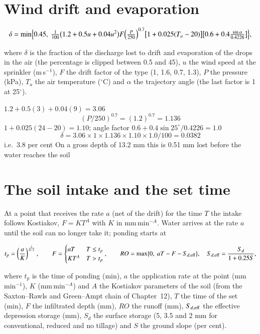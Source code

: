 \section{Wind drift and evaporation}
\begin{equation}\delta=\min\Bigl\{0.45,\ \tfrac1{100}\bigl(1.2+0.5u+0.04u^{2}\bigr)F\Bigl(\tfrac{P}{250}\Bigr)^{0.7}\bigl[1+0.025(T_a-20)\bigr]\bigl[0.6+0.4\tfrac{\sin\alpha}{0.4226}\bigr]\Bigr\},\label{eq:p-wd}\end{equation}
\par\noindent where $\delta$ is the fraction of the discharge lost to drift and evaporation of the drops in the air (the percentage is clipped between 0.5 and 45), $u$ the wind speed at the sprinkler (m\,s$^{-1}$), $F$ the drift factor of the type (1, 1.6, 0.7, 1.3), $P$ the pressure (kPa), $T_a$ the air temperature ($^\circ$C) and $\alpha$ the trajectory angle (the last factor is 1 at 25$^\circ$).

\sol $1.2+0.5(3)+0.04(9)=3.06$ \ans \[(P/250)^{0.7}=(1.2)^{0.7}=1.136\]
$1+0.025(24-20)=1.10$; angle factor $0.6+0.4\sin25^\circ/0.4226=1.0$ \ans \[\delta=3.06\times1\times1.136\times1.10\times1.0/100=0.0382\]
i.e.\ 3.8 per cent \ans On a gross depth of 13.2 mm this is 0.51 mm lost before the water reaches the soil \finans

\section{The soil intake and the set time}
At a point that receives the rate $a$ (net of the drift) for the time $T$ the intake follows Kostiakov, $F=KT^{A}$ with $K$ in mm\,min$^{-A}$. Water arrives at the rate $a$ until the soil can no longer take it; ponding starts at

\begin{equation}t_p=\left(\frac{a}{K}\right)^{\frac1{A-1}},\qquad F=\begin{cases}aT&T\le t_p\\ KT^{A}&T>t_p\end{cases},\qquad RO=\max\{0,\ aT-F-S_{d,\rm eff}\},\quad S_{d,\rm eff}=\frac{S_d}{1+0.25S},\label{eq:p-ga}\end{equation}
\par\noindent where $t_p$ is the time of ponding (min), $a$ the application rate at the point (mm\,min$^{-1}$), $K$ (mm\,min$^{-A}$) and $A$ the Kostiakov parameters of the soil (from the Saxton--Rawls and Green--Ampt chain of Chapter~12), $T$ the time of the set (min), $F$ the infiltrated depth (mm), $RO$ the runoff (mm), $S_{d,\rm eff}$ the effective depression storage (mm), $S_d$ the surface storage (5, 3.5 and 2 mm for conventional, reduced and no tillage) and $S$ the ground slope (per cent).



